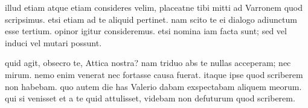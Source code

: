 


 illud etiam atque etiam consideres velim, placeatne tibi mitti ad Varronem quod scripsimus. etsi etiam ad te aliquid pertinet. nam scito te ei dialogo adiunctum esse tertium. opinor igitur consideremus. etsi nomina iam facta sunt; sed vel induci vel mutari possunt.

 quid agit, obsecro te, Attica nostra? nam triduo abs te nullas acceperam; nec mirum. nemo enim venerat nec fortasse causa fuerat. itaque ipse quod scriberem non habebam. quo autem die has Valerio dabam exspectabam aliquem meorum. qui si venisset et a te quid attulisset, videbam non defuturum quod scriberem.
